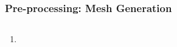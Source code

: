 \documentclass[10pt,compress]{beamer}
\begin{document}
 
\begin{frame}
 \frametitle{Pre-processing: Mesh Generation} 
    \begin{columns}
       \begin{column}[l]{0.5\linewidth}
          \begin{enumerate}\scriptsize
             \item<1-> 
          \end{enumerate}
       \end{column}
       \begin{column}[l]{0.5\linewidth}
       \end{column}
    \end{columns}
\end{frame} 
\end{document}
